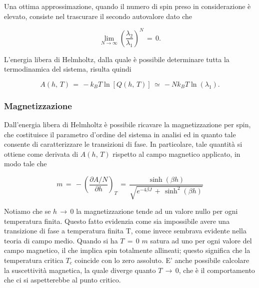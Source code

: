 Una ottima approssimazione, quando il numero di spin preso in considerazione è elevato, consiste nel trascurare il secondo autovalore 
dato che 

\begin{equation}
    \lim_{N \to \infty} \left(\frac{\lambda_2}{\lambda_1}\right)^N\,=\,0.
    \label{eq: approx_Q}
\end{equation}

L'energia libera di Helmholtz, dalla quale è possibile determinare tutta la termodinamica del sistema, risulta quindi

\begin{equation}
    A\left(h,\,T\right)\,=\,-k_B T \ln{\left[Q\left(h,\,T\right)\right]}\,\simeq\,-Nk_BT \ln{\left(\lambda_1\right)}.
    \label{eq: en_lib}
\end{equation}



\subsubsection{Magnetizzazione}

Dall'energia libera di Helmholtz è possibile ricavare la magnetizzazione per spin, che costituisce il parametro d'ordine del 
sistema in analisi ed in quanto tale consente di caratterizzare le transizioni di fase. In particolare, tale quantità si 
ottiene come derivata di $A\left(h,\,T\right)$ rispetto al campo magnetico applicato, in modo tale che

\begin{equation}
    m\,=\,-\left(\frac{\partial A/N}{\partial h}\right)_T\,=\,\frac{\sinh{\left(\beta h\right)}}{\sqrt{e^{-4\beta J}\,+\,\sinh^2\left(\beta h\right)}}
    \label{eq: magn_Ising1D_corr}
\end{equation}

Notiamo che se $h\,\to\,0$ la magnetizzazione tende ad un valore nullo per ogni temperatura finita. Questo fatto evidenzia 
come sia impossibile avere una transizione di fase a temperatura finita T, come invece sembrava evidente nella teoria di campo medio.
Quando si ha $T\,=\,0$ $m$ satura ad uno per ogni valore del campo magnetico, il che implica spin totalmente allineati; questo significa 
che la temperatura critica $T_c$ coincide con lo zero assoluto. E' anche possibile calcolare la suscettività magnetica, la quale diverge 
quanto $T\,\to\,0$, che è il comportamento che ci si aspetterebbe al punto critico. \newline

